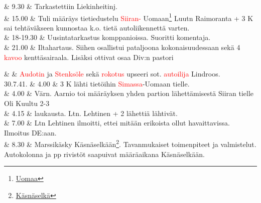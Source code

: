 \documentclass[11pt,a5paper,oneside]{book}
\begin{document}
& 9.30 & Tarkastettiin Liekinheitinj. \newline\newline \\

& 15.00 & Tuli määräys tietiedustelu \textcolor{red}{Siiran-} Uomaan\footnote{\href{https://www.google.fi/maps/place/61\%C2\%B039'46.6\%22N+31\%C2\%B050'57.7\%22E/}{Uomaa}} Luutn Raimoranta + 3 K sai tehtäväkseen kunnostaa k.o. tietä autoliikennettä varten. \newline\newline \\

& 18-19.30 & Uusintatarkastus komppanioissa. \newline Suoritti komentaja. \newline\newline \\

& 21.00 & Iltahartaus. Siihen osallistui pataljoona kokonaisuudessaan sekä 4 \textcolor{red}{kavoo} kenttäsairaala. Lisäksi ottivat osaa Div:n pastori \\
\newpage

& & \textcolor{red}{Audotin} ja \textcolor{red}{Stenksöle} sekä \textcolor{red}{rokotus} upseeri sot. \textcolor{red}{autoilija} Lindroos. \newline\newline\newline\newline\newline \\

30.7.41. & 4.00 & 3 K lähti tietöihin \textcolor{red}{Simassa}-Uomaan tielle. \\

& 4.00 & Värn. Aarnio toi määräyksen yhden partion lähettämisestä Siiran tielle Oli Kuultu 2-3 \\

& 4.15 & laukausta. Ltn. Lehtinen + 2 lähettiä lähtivät. \\

& 7.00 & Ltn Lehtinen ilmoitti, ettei mitään erikoista ollut havaittavissa. Ilmoitus DE:aan. \\

& 8.30 & Marssikäsky Käsnäselkään\footnote{\href{https://www.google.fi/maps/place/Derevnya+Kyasnyasel'kya,+Republic+of+Karelia,+Russia,+186148/}{Käsnäselkä}}. Tavanmukaiset toimenpiteet ja valmistelut. Autokolonna ja pp rivistöt saapuivat määräaikana Käsnäselkään. \\
\end{document}
